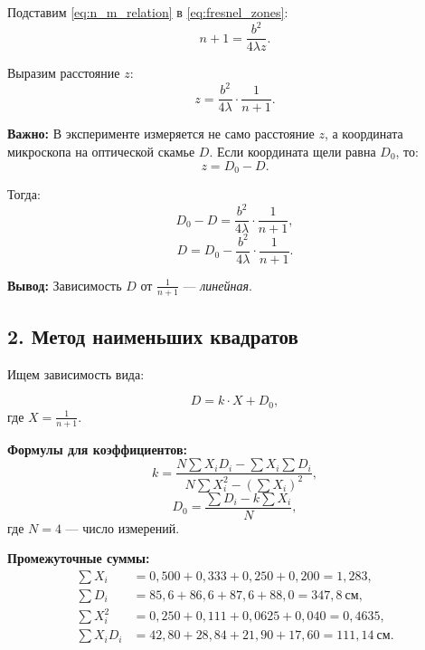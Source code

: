 \documentclass[a4paper]{article}
\begin{document}
Подставим \eqref{eq:n_m_relation} в \eqref{eq:fresnel_zones}:
\begin{equation}
    n + 1 = \frac{b^2}{4\lambda z}.
\end{equation}

Выразим расстояние $z$:
\begin{equation}
    z = \frac{b^2}{4\lambda} \cdot \frac{1}{n + 1}.
    \label{eq:z_linear}
\end{equation}

\textbf{Важно:} В эксперименте измеряется не само расстояние $z$, а координата микроскопа на оптической скамье $D$. Если координата щели равна $D_0$, то:
\begin{equation}
    z = D_0 - D.
\end{equation}

Тогда:
\begin{equation}
    D_0 - D = \frac{b^2}{4\lambda} \cdot \frac{1}{n + 1},
\end{equation}
\begin{equation}
    D = D_0 - \frac{b^2}{4\lambda} \cdot \frac{1}{n + 1}.
    \label{eq:D_linear}
\end{equation}

\textbf{Вывод:} Зависимость $D$ от $\displaystyle \frac{1}{n+1}$ --- \textit{линейная}.

\subsection*{2. Метод наименьших квадратов}

Ищем зависимость вида:

\begin{equation}
    D = k \cdot X + D_0,
    \label{eq:linear_fit}
\end{equation}
где $X = \displaystyle \frac{1}{n+1}$.

\textbf{Формулы для коэффициентов:}
\begin{equation}
    k = \frac{N \sum X_i D_i - \sum X_i \sum D_i}{N \sum X_i^2 - (\sum X_i)^2},
    \label{eq:slope}
\end{equation}
\begin{equation}
    D_0 = \frac{\sum D_i - k \sum X_i}{N},
    \label{eq:intercept}
\end{equation}
где $N = 4$ --- число измерений.

\textbf{Промежуточные суммы:}
\begin{align}
    \sum X_i &= 0,500 + 0,333 + 0,250 + 0,200 = 1,283, \\
    \sum D_i &= 85,6 + 86,6 + 87,6 + 88,0 = 347,8~\text{см}, \\
    \sum X_i^2 &= 0,250 + 0,111 + 0,0625 + 0,040 = 0,4635, \\
    \sum X_i D_i &= 42,80 + 28,84 + 21,90 + 17,60 = 111,14~\text{см}.
\end{align}
\end{document}

